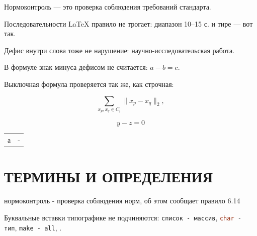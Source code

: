 Нормоконтроль — это проверка соблюдения требований стандарта.

Последовательности LaTeX правило не трогает: диапазон 10--15 с. и тире --- вот так.

Дефис внутри слова тоже не нарушение: научно-исследовательская работа.

В формуле знак минуса дефисом не считается: $a - b = c$.

Выключная формула проверяется так же, как строчная:

\begin{equation}
	\sum_{x_p, x_q \in C_i} \| x_p - x_q \|_2,
	\label{intra}
\end{equation}

\[
	y - z = 0
\]

\begin{tabular}{ll}
  а & - \\
\end{tabular}

\section*{ТЕРМИНЫ И ОПРЕДЕЛЕНИЯ}

нормоконтроль - проверка соблюдения норм, об этом сообщает правило 6.14

Буквальные вставки типографике не подчиняются: \verb|список - массив|,
\lstinline[language=C]|char - тип|, \texttt{make - all}, .
